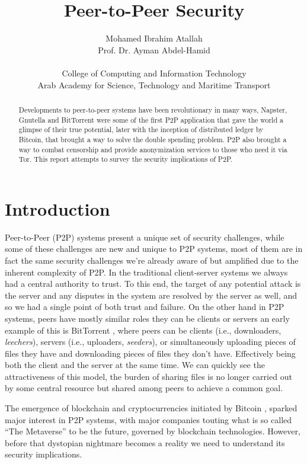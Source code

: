 \documentclass[12pt,twocolumn]{article}
\author{
    Mohamed Ibrahim Atallah 
    \\
    Prof. Dr. Ayman Abdel-Hamid
    \\
    \\ 
    College of Computing and Information Technology 
    \\ 
    Arab Academy for Science, Technology and Maritime Transport}
\title{Peer-to-Peer Security}
\begin{document}
\maketitle
\begin{abstract}
    Developments to peer-to-peer systems have been revolutionary in many ways, 
    Napster, Gnutella and BitTorrent were some of the first P2P application that
    gave the world a glimpse of their true potential, later with the inception of
    distributed ledger by Bitcoin, that brought a way to solve the double spending
    problem. P2P also brought a way to combat censorship and provide anonymization
    services to those who need it via Tor. This report attempts to survey
    the security implications of P2P.
\end{abstract}

\section{Introduction}
Peer-to-Peer (P2P) systems present a unique set of security challenges, while some of
these challenges are new and unique to P2P systems, most of them are in fact the same 
security challenges we're already aware of but amplified due to the inherent complexity of P2P.
In the traditional client-server systems we always had a central
authority to trust. To this end, the target of any potential attack is the server and
any disputes in the system are resolved by the server as well, and so we had a single 
point of both trust and failure. On the other hand in P2P systems, peers have mostly 
similar roles they can be clients or servers an early example of this is BitTorrent 
\cite{bittorrent}, where peers can be clients (i.e., downloaders, \emph{leechers}), 
servers (i.e., uploaders, \emph{seeders}), or simultaneously uploading pieces of files they
have and downloading pieces of files they don't have. Effectively being both the client and 
the server at the same time. We can quickly see the attractiveness of this model, the burden of
sharing files is no longer carried out by some central resource but shared among peers 
to achieve a common goal.


The emergence of blockchain and cryptocurrencies initiated by Bitcoin \cite{bitcoin}, 
sparked major interest in P2P systems, with major companies touting what is so called ``The Metaverse'' 
to be the future, governed by blockchain technologies. However, before that dystopian nightmare
becomes a reality we need to
understand its security implications.
\end{document}
